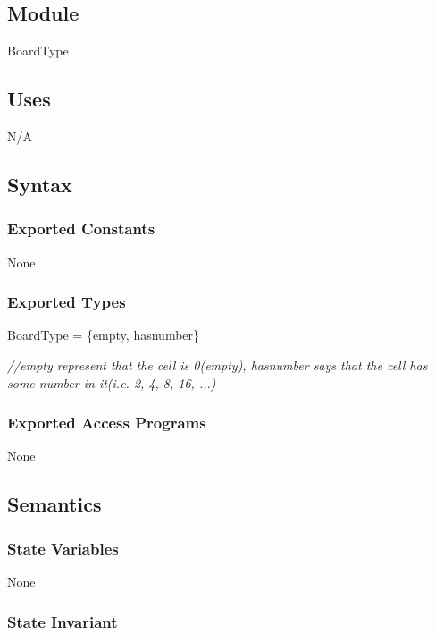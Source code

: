 \documentclass[12pt]{article}
\begin{document}
\subsection*{Module}

BoardType

\subsection* {Uses}

N/A

\subsection* {Syntax}

\subsubsection* {Exported Constants}

None

\subsubsection* {Exported Types}

BoardType = \{empty, hasnumber\}

\medskip

\noindent \textit{//empty represent that the cell is 0(empty), hasnumber says that the cell has some number in it(i.e. 2, 4, 8, 16, ...)}

\subsubsection* {Exported Access Programs}

None

\subsection* {Semantics}

\subsubsection* {State Variables}

None

\subsubsection* {State Invariant}
\end{document}
